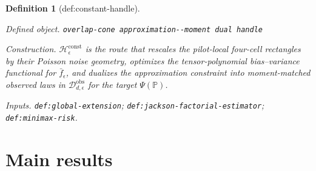 \documentclass{article}
\newtheorem{definition}{Definition}
\begin{document}
\begin{definition}[def:constant-handle]\label{def:constant-handle}
\par\smallskip\noindent\emph{Defined object.} \texttt{overlap-\allowbreak{}cone approximation-\allowbreak{}-\allowbreak{}moment dual handle}
\par\smallskip\noindent\emph{Construction.} \(\mathscr H_\epsilon^{\mathrm{const}}\) is the route that rescales the pilot-local four-cell rectangles by their Poisson noise geometry, optimizes the tensor-polynomial bias--variance functional for \(\bar f_\epsilon\), and dualizes the approximation constraint into moment-matched observed laws in \(\mathcal D_{d,\epsilon}^{\mathrm{obs}}\) for the target \(\Psi(\mathbb P)\).
\par\smallskip\noindent\emph{Inputs.} \texttt{def:\allowbreak{}global-\allowbreak{}extension}; \texttt{def:\allowbreak{}jackson-\allowbreak{}factorial-\allowbreak{}estimator}; \texttt{def:\allowbreak{}minimax-\allowbreak{}risk}.
\end{definition}

\section{Main results}
\end{document}
